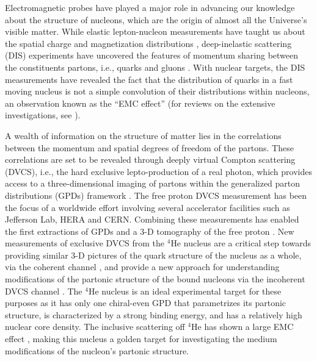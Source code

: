 \documentclass[twocolumn,nofootinbib,showpacs,prl,superscriptaddress,secnumarabic,amssymb,nobibnotes,aps,floatfix]{revtex4}
\begin{document}
Electromagnetic probes have played a major role in advancing our knowledge 
about the structure of nucleons, which are the origin of almost all the
Universe's visible matter. While elastic lepton-nucleon measurements have 
taught us about the spatial charge and magnetization distributions 
\cite{Hofstadter:1955ae,Perdrisat:2006hj}, deep-inelastic scattering (DIS) 
experiments have uncovered the features of momentum sharing between the 
constituents partons, i.e., quarks and gluons \cite{Dokshitzer:1977sg,pdg}.  
With nuclear targets, the DIS measurements have revealed the fact that the 
distribution of quarks in a fast moving nucleus is not a simple convolution of 
their distributions within nucleons, an observation known as the ``EMC 
effect''\cite{EMC_first} (for reviews on the extensive investigations, see  
\cite{EMC_CERN,EMC_SLAC,EMC_HERMES,EMC_JLab,EMC_John,EMC_mdeium_1,EMC_medium_2}).

A wealth of information on the structure of matter lies in the correlations 
between the momentum and spatial degrees of freedom of the partons. These 
correlations are set to be revealed through deeply virtual Compton scattering 
(DVCS), i.e., the hard exclusive lepto-production of a real photon, which 
provides access to a three-dimensional imaging of partons within the 
generalized parton distributions (GPDs) framework 
\cite{Mueller:1998fv,Ji:1996ek,Ji:1996nm,Radyushkin:1996nd,Radyushkin:1997ki}.   
The free proton DVCS measurement has been the focus of a worldwide effort 
\cite{Stepanyan:2001sm,Airapetian:2001yk,Airapetian:2006zr,Chekanov:2003ya,Aktas:2005ty,Chen:2006na,Munoz 
Camacho:2006hx,Girod:2007aa,Mazouz:2007aa,Gavalian:2009,Seder:2015,Pisano:2015,Jo:2015ema}
involving several accelerator facilities such as Jefferson Lab, HERA and  
CERN. Combining these measurements has enabled the first extractions of GPDs 
and a 3-D tomography of the free proton \cite{Guidal:2013rya,Dupre:2016mai}.  
New measurements of exclusive DVCS from the $^{4}$He nucleus are a critical 
step towards providing similar 3-D pictures of the quark structure of the 
nucleus as a whole, via the coherent channel 
\cite{Airapetian:2009cga,Hattawy:2017woc}, and provide a new approach for 
understanding modifications of the partonic structure of the bound nucleons via 
the incoherent DVCS channel \cite{simonetta_2,Guzey:2006xi,Guzey:2008fe}. The 
$^{4}$He nucleus is an ideal experimental target for these purposes as it has 
only one chiral-even GPD that parametrizes its partonic structure, is 
characterized by a strong binding energy, and has a relatively high nuclear 
core density. The inclusive scattering off $^{4}$He has shown a large EMC 
effect \cite{JSeely}, making this nucleus a golden target for investigating the 
medium modifications of the nucleon's partonic structure. 
\end{document}
